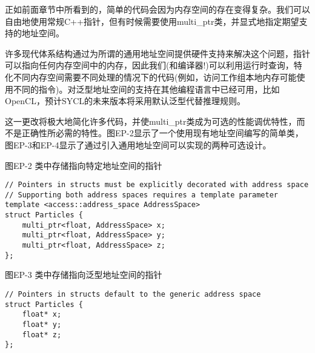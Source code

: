 正如前面章节中所看到的，简单的代码会因为内存空间的存在变得复杂。我们可以自由地使用常规C++指针，但有时候需要使用multi\_ptr类，并显式地指定期望支持的地址空间。\par

许多现代体系结构通过为所谓的通用地址空间提供硬件支持来解决这个问题，指针可以指向任何内存空间中的内存，因此我们(和编译器!)可以利用运行时查询，特化不同内存空间需要不同处理的情况下的代码(例如，访问工作组本地内存可能使用不同的指令)。对泛型地址空间的支持在其他编程语言中已经可用，比如OpenCL，预计SYCL的未来版本将采用默认泛型代替推理规则。\par

这一更改将极大地简化许多代码，并使multi\_ptr类成为可选的性能调优特性，而不是正确性所必需的特性。图EP-2显示了一个使用现有地址空间编写的简单类，图EP-3和EP-4显示了通过引入通用地址空间可以实现的两种可选设计。\par

\hspace*{\fill} \par %
图EP-2 类中存储指向特定地址空间的指针
\begin{lstlisting}[caption={}]
// Pointers in structs must be explicitly decorated with address space
// Supporting both address spaces requires a template parameter
template <access::address_space AddressSpace>
struct Particles {
	multi_ptr<float, AddressSpace> x;
	multi_ptr<float, AddressSpace> y;
	multi_ptr<float, AddressSpace> z;
};
\end{lstlisting}

\hspace*{\fill} \par %
图EP-3 类中存储指向泛型地址空间的指针
\begin{lstlisting}[caption={}]
// Pointers in structs default to the generic address space
struct Particles {
	float* x;
	float* y;
	float* z;
};
\end{lstlisting}

